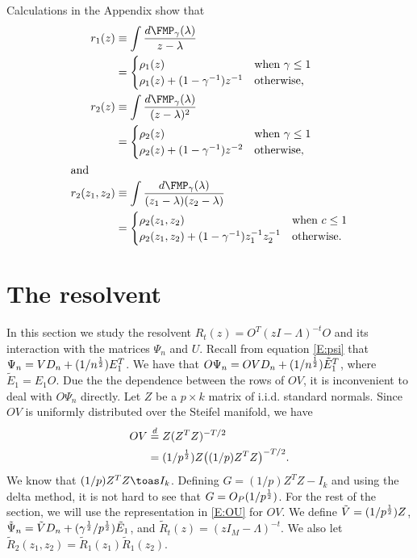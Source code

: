 Calculations in the Appendix show that
\begin{align}
    r_{1}(z)
        &\equiv \int \frac{d\FMP_\gamma(\lambda)}{z - \lambda} \notag \\
        &= \begin{cases}
               \rho_1(z) &\text{when $\gamma \leq 1$} \\
               \rho_1(z) + (1 - \gamma^{-1}) z^{-1} &\text{otherwise,}
           \end{cases} 
           \label{E:r1-z} \\
    r_{2}(z)
        &\equiv \int \frac{d\FMP_\gamma(\lambda)}{(z - \lambda)^2} \notag \\
        &= \begin{cases}
               \rho_2(z) &\text{when $\gamma \leq 1$} \\
               \rho_2(z) + (1 - \gamma^{-1}) z^{-2} &\text{otherwise,}
           \end{cases} 
           \label{E:r2-z} \\
\intertext{and}
    r_2(z_1, z_2)
        &\equiv \int \frac{d\FMP_\gamma(\lambda)}
                          {(z_1 - \lambda)(z_2 - \lambda)} \notag \\    
        &= \begin{cases}
               \rho_2(z_1, z_2) &\text{when $c \leq 1$} \\
               \rho_2(z_1, z_2) + (1 - \gamma^{-1}) z_1^{-1} z_2^{-1} &\text{otherwise.}
           \end{cases} 
           \label{E:r2-z1-z2}
\end{align}


\section{The resolvent}\label{S:resolvent}

In this section we study the resolvent $R_t(z) = O^T (z I - \Lambda)^{-t} O$ 
and its interaction with the matrices $\Psi_n$ and $U$.  Recall from equation
\eqref{E:psi} that $\Psi_n = V D_n + (1/n^{\frac{1}{2}}) E_1^T$.  We have that
$O \Psi_n = O V D_n + (1/n^{\frac{1}{2}}) \tilde E_1^T$, where $\tilde E_1 = E_1 O$.
Due the the dependence between the rows of $O V$, it is inconvenient to
deal with $O \Psi_n$ directly.  Let $Z$ be a $p \times k$ matrix of i.i.d. standard normals.  Since $O V$ is uniformly distributed over the Steifel manifold, we have
\begin{align}\label{E:OU}
    O V
        &\overset{d}{=} Z (Z^T Z)^{-T/2}  \notag \\
        &= (1/p^{\frac{1}{2}}) Z \big((1/p) Z^T Z\big)^{-T/2}.  
\end{align}    
We know that
$(1/p) Z^T Z \toas I_k$.  Defining $G = (1/p) Z^T Z - I_k$ and using the
delta method, it is not hard to see that $G = O_P(1/p^{\frac{1}{2}})$.  For the rest
of the section, we will use the representation in \eqref{E:OU} for $OV$.  We
define $\tilde V = (1/p^{\frac{1}{2}}) Z$,
$\tilde \Psi_n =  \tilde V D_n + (\gamma^{\frac{1}{2}} / p^{\frac{1}{2}}) \tilde E_1$,
and $\tilde R_t (z) = (z I_M - \Lambda)^{-t}$.  We also let 
$\tilde R_2(z_1, z_2) = \tilde R_1 (z_1) \tilde R_1 (z_2)$.


